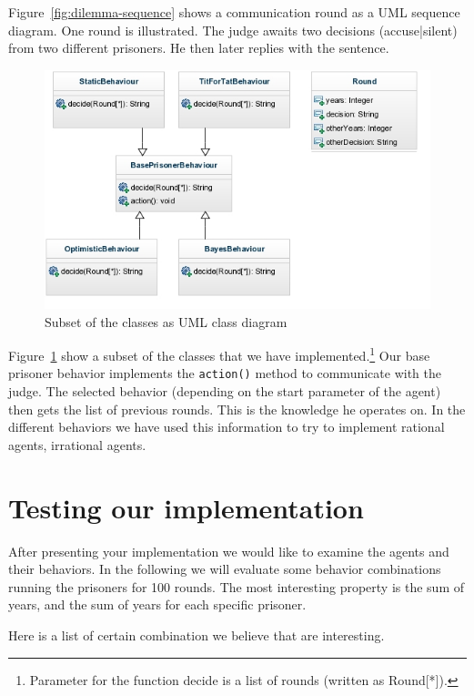 \documentclass{acm_proc_article-sp}
\begin{document}
Figure~\ref{fig:dilemma-sequence} shows a communication round as a UML sequence diagram.
One round is illustrated. The judge awaits two decisions (accuse|silent) from two different
prisoners. He then later replies with the sentence.

\begin{figure}
\begin{center}
\includegraphics{dilemma-minimal-classes}
\end{center}
\caption{Subset of the classes as UML class diagram}
\label{fig:dilemma-classes}
\end{figure}

Figure~\ref{fig:dilemma-classes} show a subset of the classes that we have implemented.\footnote{Parameter for the function decide is a list of rounds (written as Round[*]).}
Our base prisoner behavior implements the \lstinline!action()! method to communicate with
the judge. The selected behavior (depending on the start parameter of the agent) then
gets the list of previous rounds. This is the knowledge he operates on. In the
different behaviors we have used this information to try to implement rational agents,
irrational agents.

\section{Testing our implementation}

After presenting your implementation we would like to examine the agents and their behaviors.
In the following we will evaluate some behavior combinations running the prisoners for 100 rounds.
The most interesting property is the sum of years, and the sum of years for each specific prisoner.

Here is a list of certain combination we believe that are interesting.
\end{document}
